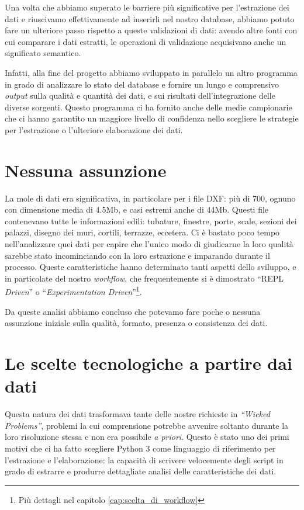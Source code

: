 \documentclass[12pt]{report}
\begin{document}
Una volta che abbiamo superato le barriere più significative per l'estrazione 
dei dati e riuscivamo effettivamente ad inserirli nel nostro 
database, abbiamo potuto fare un ulteriore passo rispetto a 
queste validazioni di dati: avendo altre fonti con cui comparare i dati
estratti, le operazioni di validazione acquisivano anche un significato
semantico. %

Infatti, alla fine del progetto abbiamo sviluppato in parallelo
un altro programma in grado di analizzare lo stato del database 
e fornire un lungo e comprensivo \textit{output} sulla 
qualità e quantità dei dati, e sui risultati dell'integrazione delle 
diverse sorgenti. Questo programma ci ha fornito anche delle medie campionarie che ci hanno 
garantito un maggiore livello di confidenza nello scegliere le
strategie per l'estrazione o l'ulteriore elaborazione dei dati.

\section*{Nessuna assunzione}

La mole di dati era significativa, in particolare per i file DXF: più di
700, ognuno con dimensione media di 4.5Mb, e casi estremi anche di
44Mb. Questi file contenevano tutte le informazioni edili: tubature,
finestre, porte, scale, sezioni dei palazzi, disegno dei muri,
cortili, terrazze, eccetera. Ci è bastato poco tempo nell'analizzare quei
dati per capire che l'unico modo di giudicarne la loro qualità sarebbe
stato incominciando con la loro estrazione e imparando durante il
processo. Queste caratteristiche hanno determinato tanti aspetti dello
sviluppo, e in particolate del nostro \textit{workflow}, che frequentemente si è
dimostrato ``REPL \textit{Driven}'' o ``\textit{Experimentation
Driven}''\footnote{Più dettagli nel capitolo \ref{cap:scelta_di_workflow}}. 

Da queste analisi abbiamo concluso che potevamo fare poche o nessuna
assunzione iniziale sulla qualità, formato, presenza o consistenza dei dati.

\section{Le scelte tecnologiche a partire dai dati}

Questa natura dei dati trasformava tante delle nostre richieste in
\textit{``Wicked Problems''}, problemi la cui comprensione potrebbe
avvenire soltanto durante la loro risoluzione stessa e non era
possibile \textit{a priori}. Questo è stato uno dei primi motivi che
ci ha fatto scegliere Python 3 come linguaggio di riferimento per
l'estrazione e l'elaborazione: la capacità di scrivere velocemente
degli script in grado di estrarre e produrre dettagliate analisi delle
caratteristiche dei dati. 
\end{document}
